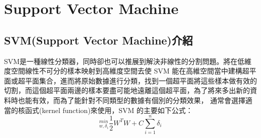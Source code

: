 \chapter{Support Vector Machine }
\label{chapter:intro}
\section{SVM(Support Vector Machine)介紹}
SVM是一種線性分類器，同時卻也可以推展到解決非線性的分割問題。將在低維度空間線性不可分的樣本映射到高維度空間去使 SVM 能在高維空間當中建構超平面或超平面集合，進而將原始數據進行分類，找到一個超平面將這些樣本做有效的切割，而這個超平面兩邊的樣本要盡可能地遠離這個超平面，為了將來多出新的資料時也能有效，而為了能針對不同類型的數據有個別的分類效果，
通常會選擇適當的核函式(kernel function)來使用，SVM 的主要如下公式：
\begin{equation}
	\label{equ:SVM}
	_{w,\delta_i}^{min}\frac{1}{2}W^TW+C\sum_{i=1}^{n}\delta_i
\end{equation}



